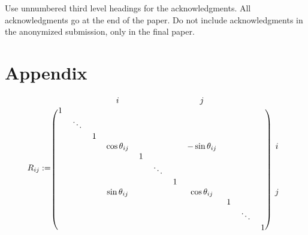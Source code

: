 \documentclass{article}
\begin{document}
Use unnumbered third level headings for the acknowledgments. All
acknowledgments go at the end of the paper. Do not include
acknowledgments in the anonymized submission, only in the final paper.


\section*{Appendix}
\[
R_{ij} := 
\begin{blockarray}{cccccccccccc}
 & & & i &  & & & j & & \\
\begin{block}{(ccccccccccc)c}
  1 &  &  &  &  & & & &  & & &  \\
   & \ddots &  &  & & & & &  & & &  \\
   &  & 1  &  &  & & & &  & & & \\
   & & & \cos \theta_{ij} &  & &  & -\sin \theta_{ij} &  & & & i \\
   & & & & 1  & &  & &  & & & \\
   & & &  & & \ddots  &  & &  & & &  \\
   & & &  & & & 1 & &  & & &  \\
   & & & \sin \theta_{ij}  &  & &  & \cos \theta_{ij} &  & & & j \\
   & & &  &  & &  & & 1 & & & \\
   & & &  &  & &  & & & \ddots & & \\
      & & &  &  & &  & & & & 1 & \\
\end{block}
\end{blockarray}
 \]
\end{document}

